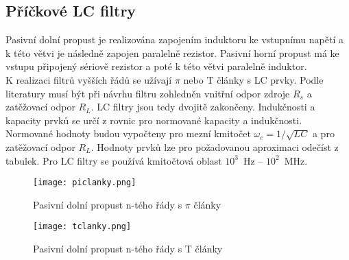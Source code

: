 \subsection{Příčkové LC filtry}\label{s:LC}
Pasivní dolní propust je realizována zapojením induktoru ke vstupnímu napětí a k této větvi je následně zapojen paralelně rezistor. Pasivní horní propust má ke vstupu připojený sériově rezistor a poté k této větvi paralelně induktor. \\
K realizaci filtrů vyšších řádů se užívají $\pi$ nebo T články s LC prvky. Podle literatury \cite{18} musí být při návrhu filtru zohledněn vnitřní odpor zdroje $R_s$ a zatěžovací odpor $R_L$. LC filtry jsou tedy dvojitě zakončeny. Indukčnosti a kapacity prvků se určí z rovnic pro normované kapacity a indukčnosti. Normované hodnoty budou vypočteny pro mezní kmitočet $\omega _c = 1/\sqrt{LC}$ a pro zatěžovací odpor $R_L$. Hodnoty prvků lze pro požadovanou aproximaci odečíst z tabulek. Pro LC filtry se používá kmitočtová oblast $10^{3}$~Hz -- $10^{2}$~MHz.\\
\begin{figure}[h]
\centering
\texttt{[image: piclanky.png]}
\caption[Pasivní dolní propust n-tého řády s $\pi$ články]{Pasivní dolní propust n-tého řády s $\pi$ články \cite{18}}
\end{figure}
\begin{figure}[h]
\centering
\texttt{[image: tclanky.png]}
\caption[Pasivní dolní propust n-tého řády s T články]{Pasivní dolní propust n-tého řády s T články \cite{18}}
\end{figure}
